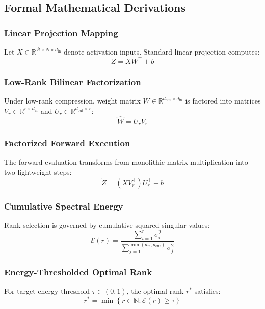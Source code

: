 \subsection{Formal Mathematical Derivations}

\subsubsection{Linear Projection Mapping}
Let $X \in \mathbb{R}^{\mathcal{B} \times N \times d_{\text{in}}}$ denote activation inputs. Standard linear projection computes:
\begin{equation}
Z = X W^\top + b
\end{equation}

\subsubsection{Low-Rank Bilinear Factorization}
Under low-rank compression, weight matrix $W \in \mathbb{R}^{d_{\text{out}} \times d_{\text{in}}}$ is factored into matrices $V_r \in \mathbb{R}^{r \times d_{\text{in}}}$ and $U_r \in \mathbb{R}^{d_{\text{out}} \times r}$:
\begin{equation}
\hat{W} = U_r V_r
\end{equation}

\subsubsection{Factorized Forward Execution}
The forward evaluation transforms from monolithic matrix multiplication into two lightweight steps:
\begin{equation}
\tilde{Z} = (X V_r^\top) U_r^\top + b
\end{equation}

\subsubsection{Cumulative Spectral Energy}
Rank selection is governed by cumulative squared singular values:
\begin{equation}
\mathcal{E}(r) = \frac{\sum_{i=1}^{r} \sigma_i^2}{\sum_{j=1}^{\min(d_{\text{in}}, d_{\text{out}})} \sigma_j^2}
\end{equation}

\subsubsection{Energy-Thresholded Optimal Rank}
For target energy threshold $\tau \in (0, 1)$, the optimal rank $r^*$ satisfies:
\begin{equation}
r^* = \min \left\{ r \in \mathbb{N} : \mathcal{E}(r) \ge \tau \right\}
\end{equation}

